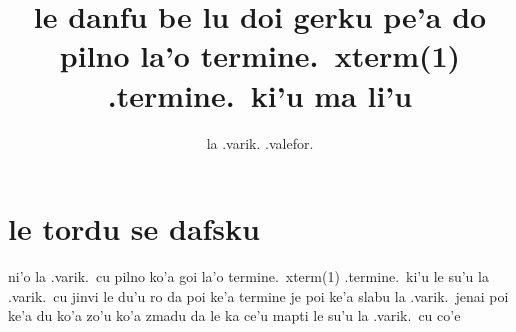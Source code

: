 \documentclass{article}
\title{le danfu be lu doi gerku pe'a do pilno la'o termine.\ xterm(1) .termine.\ ki'u ma li'u}
\author{la .varik. .valefor.}
\begin{document}
\maketitle

\section{le tordu se dafsku}
ni'o la .varik.\ cu pilno ko'a goi la'o termine.\ xterm(1) .termine.\ ki'u le su'u la .varik.\ cu jinvi le du'u ro da poi ke'a termine je poi ke'a slabu la .varik.\ jenai poi ke'a du ko'a zo'u ko'a zmadu da le ka ce'u mapti le su'u la .varik.\ cu co'e
\end{document}
